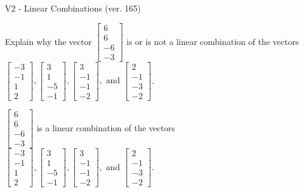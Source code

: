 \begin{exercise}
  \begin{exerciseTitle}V2 - Linear Combinations (ver. 165)\end{exerciseTitle}
  \begin{exerciseStatement}
    Explain why the vector \(\left[\begin{array}{c}
6 \\
6 \\
-6 \\
-3
\end{array}\right]\)  is or is not a linear 
	combination of the vectors \(\left[\begin{array}{c}
-3 \\
-1 \\
1 \\
2
\end{array}\right] , \left[\begin{array}{c}
3 \\
1 \\
-5 \\
-1
\end{array}\right] , \left[\begin{array}{c}
3 \\
-1 \\
-1 \\
-2
\end{array}\right] , \text{ and } \left[\begin{array}{c}
2 \\
-1 \\
-3 \\
-2
\end{array}\right]\).
	


  \end{exerciseStatement}
  \begin{exerciseAnswer}
   \(\left[\begin{array}{c}
6 \\
6 \\
-6 \\
-3
\end{array}\right]\) 
  	 is  
	a linear combination of the vectors \(\left[\begin{array}{c}
-3 \\
-1 \\
1 \\
2
\end{array}\right] , \left[\begin{array}{c}
3 \\
1 \\
-5 \\
-1
\end{array}\right] , \left[\begin{array}{c}
3 \\
-1 \\
-1 \\
-2
\end{array}\right] , \text{ and } \left[\begin{array}{c}
2 \\
-1 \\
-3 \\
-2
\end{array}\right]\).


\end{exerciseAnswer}
\end{exercise}
